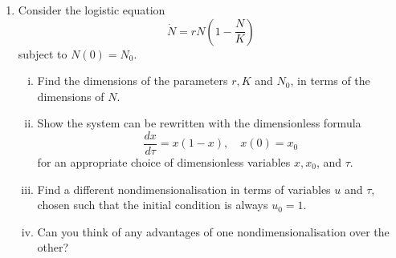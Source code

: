 \documentclass{article}
\begin{document}
\begin{enumerate}
    \item Consider the logistic equation
    \[
    \dot N = rN\left(1-\frac NK\right)
    \]
    subject to $N(0) = N_0$.
    \begin{enumerate}[(i)]
        \item Find the dimensions of the parameters $r,K$ and $N_0$, in terms of the dimensions of $N$.
        \item Show the system can be rewritten with the dimensionless formula
        \[
        \frac{dx}{d\tau} = x(1-x),\quad x(0) = x_0
        \]
        for an appropriate choice of dimensionless variables $x,x_0$, and  $\tau$.
        \item Find a different nondimensionalisation in terms of variables $u$ and $\tau$, chosen such that the initial condition is always $u_0=1$.
        \item Can you think of any advantages of one nondimensionalisation over the other?
    \end{enumerate}
\end{enumerate}
\end{document}

